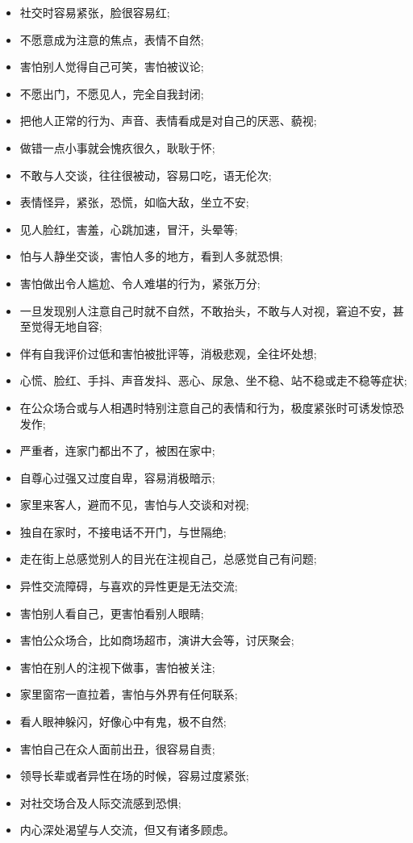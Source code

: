 \begin{multicols}{2}
    \begin{itemize}
        \item 社交时容易紧张，脸很容易红;
        \item 不愿意成为注意的焦点，表情不自然;
        \item 害怕别人觉得自己可笑，害怕被议论;
        \item 不愿出门，不愿见人，完全自我封闭;
        \item 把他人正常的行为、声音、表情看成是对自己的厌恶、藐视;
        \item 做错一点小事就会愧疚很久，耿耿于怀;
        \item 不敢与人交谈，往往很被动，容易口吃，语无伦次;
        \item 表情怪异，紧张，恐慌，如临大敌，坐立不安;
        \item 见人脸红，害羞，心跳加速，冒汗，头晕等;
        \item 怕与人静坐交谈，害怕人多的地方，看到人多就恐惧;
        \item 害怕做出令人尴尬、令人难堪的行为，紧张万分;
        \item 一旦发现别人注意自己时就不自然，不敢抬头，不敢与人对视，窘迫不安，甚至觉得无地自容;
        \item 伴有自我评价过低和害怕被批评等，消极悲观，全往坏处想;
        \item 心慌、脸红、手抖、声音发抖、恶心、尿急、坐不稳、站不稳或走不稳等症状;
        \item 在公众场合或与人相遇时特别注意自己的表情和行为，极度紧张时可诱发惊恐发作;
        \item 严重者，连家门都出不了，被困在家中;
        \item 自尊心过强又过度自卑，容易消极暗示;
        \item 家里来客人，避而不见，害怕与人交谈和对视;
        \item 独自在家时，不接电话不开门，与世隔绝;
        \item 走在街上总感觉别人的目光在注视自己，总感觉自己有问题;
        \item 异性交流障碍，与喜欢的异性更是无法交流;
        \item 害怕别人看自己，更害怕看别人眼睛;
        \item 害怕公众场合，比如商场超市，演讲大会等，讨厌聚会;
        \item 害怕在别人的注视下做事，害怕被关注;
        \item 家里窗帘一直拉着，害怕与外界有任何联系;
        \item 看人眼神躲闪，好像心中有鬼，极不自然;
        \item 害怕自己在众人面前出丑，很容易自责;
        \item 领导长辈或者异性在场的时候，容易过度紧张;
        \item 对社交场合及人际交流感到恐惧;
        \item 内心深处渴望与人交流，但又有诸多顾虑。
    \end{itemize}
\end{multicols}

